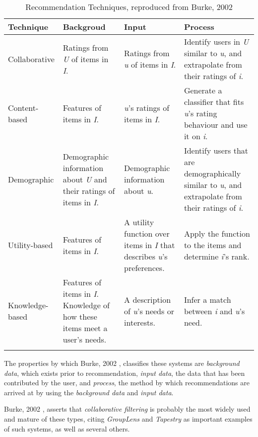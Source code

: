\begin{table}[ht]
    \caption{Recommendation Techniques, reproduced from Burke, 2002 \cite{Burke02}}
    \centering
    \begin{tabular}{p{2.5cm} p{3.5cm} p{3.5cm} p{3.5cm}}
        Technique & Backgroud & Input & Process
        \\\hline\hline
        Collaborative & Ratings from \textit{U} of items in \textit{I}. & Ratings from \textit{u} of items in \textit{I}. & Identify users in \textit{U} similar to \textit{u}, and extrapolate from their ratings of \textit{i}. \\
        Content-based & Features of items in \textit{I}. & \textit{u}'s ratings of items in \textit{I}. & Generate a classifier that fits \textit{u}'s rating behaviour and use it on \textit{i}. \\ 
        Demographic & Demographic information about \textit{U} and their ratings of items in \textit{I}. & Demographic information about \textit{u}. & Identify users that are demographically similar to \textit{u}, and extrapolate from their ratings of \textit{i}. \\
        Utility-based & Features of items in \textit{I}. & A utility function over items in \textit{I} that describes \textit{u}'s preferences. & Apply the function to the items and determine \textit{i}'s rank. \\
        Knowledge-based & Features of items in \textit{I}. Knowledge of how these items meet a user's needs. & A description of \textit{u}'s needs or interests. & Infer a match between \textit{i} and \textit{u}'s need. \\
        \\\hline
    \end{tabular}
    \label{table:burke02}
\end{table}

The properties by which Burke, 2002 \cite{Burke02}, classifies these systems are \textit{background data}, which exists prior to recommendation, \textit{input data}, the data that has been contributed by the user, and \textit{process}, the method by which recommendations are arrived at by using the \textit{background data} and \textit{input data}.

Burke, 2002 \cite{Burke02}, asserts that \textit{collaborative filtering} is probably the most widely used and mature of these types, citing \textit{GroupLens} \cite{Resnick94} and \textit{Tapestry} \cite{Goldberg92} as important examples of such systems, as well as several others. 

